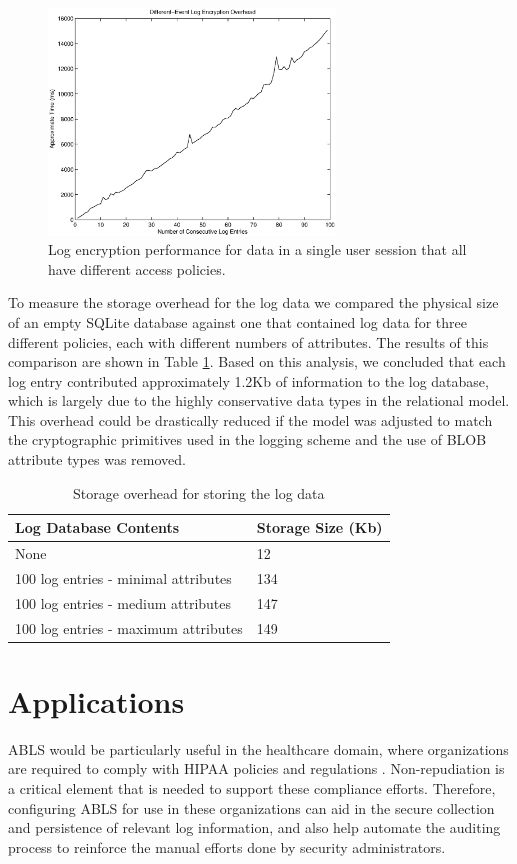 \documentclass{sig-alternate}
\begin{document}
\begin{figure}[ht!]
\begin{center}
\includegraphics[width=3in]{images/logPerfDiffEvents.eps}
\caption{Log encryption performance for data in a single user session that all have different access policies.}
\label{fig:logPerfDiffEvents}
\end{center}
\end{figure}

To measure the storage overhead for the log data we compared the physical size of an empty SQLite database against
one that contained log data for three different policies, each with different numbers of attributes. The results of
this comparison are shown in Table \ref{tab:storage}. Based on this analysis, we concluded that each log entry contributed
approximately 1.2Kb of information to the log database, which is largely due to the highly conservative data types in the relational model.
This overhead could be drastically reduced if the model was adjusted to match the cryptographic primitives used in
the logging scheme and the use of BLOB attribute types was removed.

\begin{table}
\caption{Storage overhead for storing the log data}
  \begin{tabular}{|l|l|}
    \hline
    Log Database Contents & Storage Size (Kb) \\ \hline
    None & 12 \\ 
    100 log entries - minimal attributes & 134 \\ 
    100 log entries - medium attributes & 147 \\ 
    100 log entries - maximum attributes & 149 \\
    \hline
  \end{tabular}
  \label{tab:storage}
\end{table}

\section{Applications}
ABLS would be particularly useful in the healthcare domain, where organizations are required to comply with HIPAA 
policies and regulations \cite{king2012modifying}. Non-repudiation is a critical element that is 
needed to support these compliance efforts. Therefore,
configuring ABLS for use in these organizations can aid in the secure collection and persistence of relevant log information,
and also help automate the auditing process to reinforce the manual efforts done by security administrators. 
\end{document}
